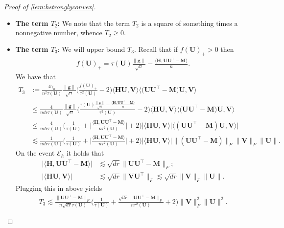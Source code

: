 \documentclass[10pt]{article}
\renewcommand{\t}{^{\top}}
\theoremstyle{definition}
\begin{document}
\begin{proof}[Proof of \cref{lem:hstronglyconvex}]
\begin{itemize}
\item \textbf{The term $T_2$:} We note that the term $T_2$ is a square of something times a nonnegative number, whence $T_2 \geq 0$.  
\item \textbf{The term $T_3$}: We will upper bound $T_3$.  Recall that if $f(\bm{U})_+ > 0$ then
\begin{align}
    f(\bm{U})_+ = \tau(\bm{U}) \frac{\|\bm{g}\|}{\sqrt{n}} - \frac{\langle \bm{H}, \bm{UU}\t - \bm{M}\rangle}{n}.
\end{align}
We have that
\begin{align}
     T_3 &:= \frac{4 \gamma_n}{n^2 \tau(\bm{U})} \frac{\|\bm{g}\|}{\sqrt{n}} \bigg( \frac{f(\bm{U})_+}{\tau^2(\bm{U})} - 2 \bigg) \bigg \langle \bm{HU}, \bm{V} \bigg \rangle \bigg \langle \big( \bm{UU}\t - \bm{M} \big) \bm{U}, \bm{V} \bigg \rangle \\
     &\leq \frac{4}{ndr \tau(\bm{U})} \frac{\|\bm{g}\|}{\sqrt{n}} \bigg( \frac{\tau(\bm{U}) \frac{\|\bm{g}\|}{\sqrt{n}} - \frac{\langle \bm{H}, \bm{UU}\t - \bm{M}\rangle}{n}}{\tau^2(\bm{U})} - 2 \bigg) \bigg \langle \bm{HU}, \bm{V} \bigg \rangle \bigg \langle \big( \bm{UU}\t - \bm{M} \big) \bm{U}, \bm{V} \bigg \rangle \\
     &\leq \frac{4}{ndr \tau(\bm{U})} \bigg( \frac{1}{\tau(\bm{U})} + \bigg| \frac{\langle \bm{H}, \bm{UU}\t - \bm{M} \rangle}{n \tau^2(\bm{U})}\bigg| + 2 \bigg) \bigg| \bigg\langle \bm{HU}, \bm{V} \bigg\rangle \bigg| \bigg\langle (\bm{UU}\t - \bm{M}) \bm{U} , \bm{V} \bigg \rangle \bigg| \\
     &\lesssim \frac{1}{ndr \tau(\bm{U})} \bigg( \frac{1}{\tau(\bm{U})} + \bigg| \frac{\langle \bm{H}, \bm{UU}\t - \bm{M} \rangle}{n \tau^2(\bm{U})}\bigg| + 2 \bigg) \bigg| \bigg \langle \bm{HU}, \bm{V} \bigg \rangle \bigg| \| (\bm{UU}\t - \bm{M} )\|_F \|\bm{V} \|_F \| \bm{U}\|.
\end{align}
On the event $\mathcal{E}_h$ it holds that 
\begin{align}
    \bigg| \bigg\langle \bm{H}, \bm{UU}\t - \bm{M} \bigg\rangle \bigg| &\lesssim \sqrt{dr} \| \bm{UU}\t - \bm{M} \|_F; \\
    \bigg| \bigg\langle \bm{HU}, \bm{V} \bigg\rangle \bigg| &\lesssim \sqrt{dr} \| \bm{VU}\t \|_F \lesssim \sqrt{dr} \| \bm{V} \|_F \| \bm{U}\|.
\end{align}
Plugging this in above yields
\begin{align}
    T_3 \lesssim \frac{\| \bm{UU}\t - \bm{M}\|_F}{n \sqrt{dr} \tau(\bm{U})} \bigg( \frac{1}{\tau(\bm{U})} + \frac{\sqrt{dr} \| \bm{UU}\t - \bm{M}\|_F}{n\tau^2(\bm{U})} + 2 \bigg) \| \bm{V} \|_F^2 \| \bm{U} \|^2.

\end{align}
\end{itemize}
\end{proof}
\end{document}
